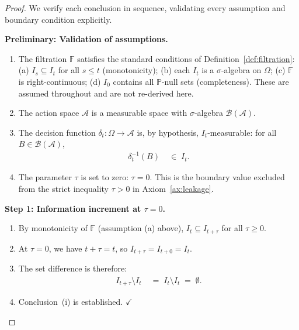 \documentclass[12pt,openany]{book}
\newcommand{\calI}{\mathcal{I}}
\newcommand{\calA}{\mathcal{A}}
\numberwithin{equation}{chapter}
\theoremstyle{plain}
\theoremstyle{definition}
\theoremstyle{remark}
\numberwithin{equation}{chapter}
\theoremstyle{plain}
\def\calI{I}%
\begin{document}
\begin{proof}
We verify each conclusion in sequence, validating every assumption and
boundary condition explicitly.

\medskip
\noindent\textbf{Preliminary: Validation of assumptions.}
\begin{enumerate}
  \item The filtration $\mathbb{F}$ satisfies the standard conditions
        of Definition~\ref{def:filtration}: (a) $\calI_s \subseteq
        \calI_t$ for all $s \leq t$ (monotonicity); (b) each
        $\calI_t$ is a $\sigma$-algebra on $\Omega$; (c)
        $\mathbb{F}$ is right-continuous; (d) $\calI_0$ contains
        all $\mathbb{P}$-null sets (completeness).  These are
        assumed throughout and are not re-derived here.
  \item The action space $\calA$ is a measurable space with
        $\sigma$-algebra $\mathcal{B}(\calA)$.
  \item The decision function $\delta_t : \Omega \to \calA$ is, by
        hypothesis, $\calI_t$-measurable: for all $B \in
        \mathcal{B}(\calA)$,
        \begin{align}
          \delta_t^{-1}(B)
          &\;\in\; \calI_t.
          \label{eq:zero-lag-meas}
        \end{align}
  \item The parameter $\tau$ is set to zero: $\tau = 0$.  This is
        the boundary value excluded from the strict inequality
        $\tau > 0$ in Axiom~\ref{ax:leakage}.
\end{enumerate}

\medskip
\noindent\textbf{Step 1: Information increment at $\tau = 0$.}
\begin{enumerate}
  \item By monotonicity of $\mathbb{F}$ (assumption (a) above),
        $\calI_t \subseteq \calI_{t+\tau}$ for all $\tau \geq 0$.
  \item At $\tau = 0$, we have $t + \tau = t$, so
        $\calI_{t+\tau} = \calI_{t+0} = \calI_t$.
  \item The set difference is therefore:
        \begin{align}
          \calI_{t+\tau} \setminus \calI_t
          &\;=\; \calI_t \setminus \calI_t
          \;=\; \emptyset.
          \label{eq:zero-lag-diff}
        \end{align}
  \item Conclusion~(i) is established. $\checkmark$
\end{enumerate}


\end{proof}
\end{document}

